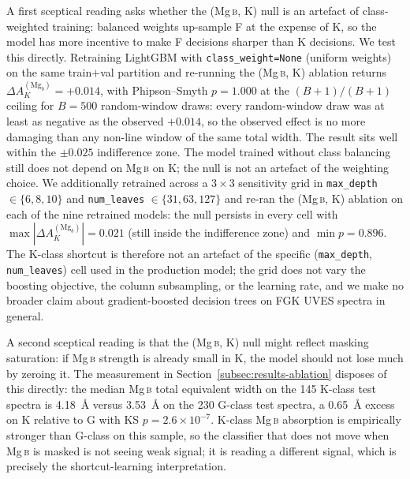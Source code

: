 \documentclass[11pt,a4paper]{article}
\newcommand{\Mgb}{Mg\,\textsc{b}\xspace}
\newcommand{\dA}{\Delta A}
\begin{document}
A first sceptical reading asks whether the (\Mgb, K) null is an artefact of class-weighted training: balanced weights up-sample F at the expense of K, so the model has more incentive to make F decisions sharper than K decisions. We test this directly. Retraining LightGBM with \texttt{class\_weight=None} (uniform weights) on the same train$+$val partition and re-running the (\Mgb, K) ablation returns $\dA_K^{(\mathrm{Mg}_b)} = +0.014$, with Phipson--Smyth $p = 1.000$ at the $(B+1)/(B+1)$ ceiling for $B = 500$ random-window draws: every random-window draw was at least as negative as the observed $+0.014$, so the observed effect is no more damaging than any non-line window of the same total width. The result sits well within the $\pm 0.025$ indifference zone. The model trained without class balancing still does not depend on \Mgb on K; the null is not an artefact of the weighting choice. We additionally retrained across a $3 \times 3$ sensitivity grid in \texttt{max\_depth} $\in \{6, 8, 10\}$ and \texttt{num\_leaves} $\in \{31, 63, 127\}$ and re-ran the (\Mgb, K) ablation on each of the nine retrained models: the null persists in every cell with $\max|\dA_K^{(\mathrm{Mg}_b)}| = 0.021$ (still inside the indifference zone) and $\min p = 0.896$. The K-class shortcut is therefore not an artefact of the specific (\texttt{max\_depth}, \texttt{num\_leaves}) cell used in the production model; the grid does not vary the boosting objective, the column subsampling, or the learning rate, and we make no broader claim about gradient-boosted decision trees on FGK UVES spectra in general.

A second sceptical reading is that the (\Mgb, K) null might reflect masking saturation: if \Mgb strength is already small in K, the model should not lose much by zeroing it. The measurement in Section~\ref{subsec:results-ablation} disposes of this directly: the median \Mgb total equivalent width on the 145 K-class test spectra is 4.18~\AA{} versus 3.53~\AA{} on the 230 G-class test spectra, a 0.65~\AA{} excess on K relative to G with KS $p = 2.6 \times 10^{-7}$. K-class \Mgb absorption is empirically stronger than G-class on this sample, so the classifier that does not move when \Mgb is masked is not seeing weak signal; it is reading a different signal, which is precisely the shortcut-learning interpretation.
\end{document}
